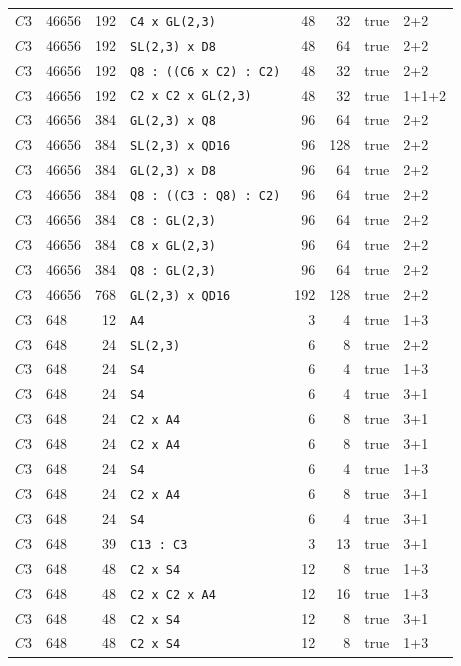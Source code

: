 \begin{longtable}{llrlrrll}
$C3$ & 46656 & 192 & \texttt{C4 x GL(2,3)} & 48 & 32 & true & 2+2\\
$C3$ & 46656 & 192 & \texttt{SL(2,3) x D8} & 48 & 64 & true & 2+2\\
$C3$ & 46656 & 192 & \texttt{Q8 : ((C6 x C2) : C2)} & 48 & 32 & true & 2+2\\
$C3$ & 46656 & 192 & \texttt{C2 x C2 x GL(2,3)} & 48 & 32 & true & 1+1+2\\
$C3$ & 46656 & 384 & \texttt{GL(2,3) x Q8} & 96 & 64 & true & 2+2\\
$C3$ & 46656 & 384 & \texttt{SL(2,3) x QD16} & 96 & 128 & true & 2+2\\
$C3$ & 46656 & 384 & \texttt{GL(2,3) x D8} & 96 & 64 & true & 2+2\\
$C3$ & 46656 & 384 & \texttt{Q8 : ((C3 : Q8) : C2)} & 96 & 64 & true & 2+2\\
$C3$ & 46656 & 384 & \texttt{C8 : GL(2,3)} & 96 & 64 & true & 2+2\\
$C3$ & 46656 & 384 & \texttt{C8 x GL(2,3)} & 96 & 64 & true & 2+2\\
$C3$ & 46656 & 384 & \texttt{Q8 : GL(2,3)} & 96 & 64 & true & 2+2\\
$C3$ & 46656 & 768 & \texttt{GL(2,3) x QD16} & 192 & 128 & true & 2+2\\
$C3$ & 648 & 12 & \texttt{A4} & 3 & 4 & true & 1+3\\
$C3$ & 648 & 24 & \texttt{SL(2,3)} & 6 & 8 & true & 2+2\\
$C3$ & 648 & 24 & \texttt{S4} & 6 & 4 & true & 1+3\\
$C3$ & 648 & 24 & \texttt{S4} & 6 & 4 & true & 3+1\\
$C3$ & 648 & 24 & \texttt{C2 x A4} & 6 & 8 & true & 3+1\\
$C3$ & 648 & 24 & \texttt{C2 x A4} & 6 & 8 & true & 3+1\\
$C3$ & 648 & 24 & \texttt{S4} & 6 & 4 & true & 1+3\\
$C3$ & 648 & 24 & \texttt{C2 x A4} & 6 & 8 & true & 3+1\\
$C3$ & 648 & 24 & \texttt{S4} & 6 & 4 & true & 3+1\\
$C3$ & 648 & 39 & \texttt{C13 : C3} & 3 & 13 & true & 3+1\\
$C3$ & 648 & 48 & \texttt{C2 x S4} & 12 & 8 & true & 1+3\\
$C3$ & 648 & 48 & \texttt{C2 x C2 x A4} & 12 & 16 & true & 1+3\\
$C3$ & 648 & 48 & \texttt{C2 x S4} & 12 & 8 & true & 3+1\\
$C3$ & 648 & 48 & \texttt{C2 x S4} & 12 & 8 & true & 1+3\\

\end{longtable}
